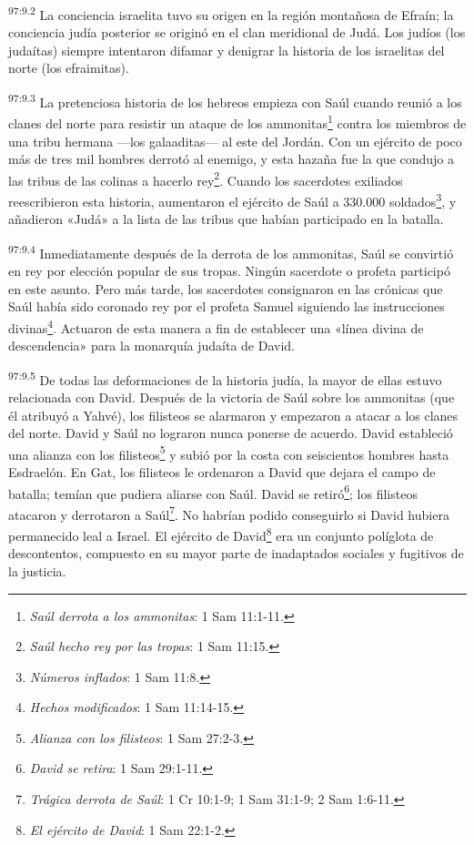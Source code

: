 \par
\textsuperscript{97:9.2} La conciencia israelita tuvo su origen en la región montañosa de Efraín; la conciencia judía posterior se originó en el clan meridional de Judá. Los judíos (los judaítas) siempre intentaron difamar y denigrar la historia de los israelitas del norte (los efraimitas).

\par
\textsuperscript{97:9.3} La pretenciosa historia de los hebreos empieza con Saúl cuando reunió a los clanes del norte para resistir un ataque de los ammonitas\footnote{\textit{Saúl derrota a los ammonitas}: 1 Sam 11:1-11.} contra los miembros de una tribu hermana ---los galaaditas--- al este del Jordán. Con un ejército de poco más de tres mil hombres derrotó al enemigo, y esta hazaña fue la que condujo a las tribus de las colinas a hacerlo rey\footnote{\textit{Saúl hecho rey por las tropas}: 1 Sam 11:15.}. Cuando los sacerdotes exiliados reescribieron esta historia, aumentaron el ejército de Saúl a 330.000 soldados\footnote{\textit{Números inflados}: 1 Sam 11:8.}, y añadieron «Judá» a la lista de las tribus que habían participado en la batalla.

\par
\textsuperscript{97:9.4} Inmediatamente después de la derrota de los ammonitas, Saúl se convirtió en rey por elección popular de sus tropas. Ningún sacerdote o profeta participó en este asunto. Pero más tarde, los sacerdotes consignaron en las crónicas que Saúl había sido coronado rey por el profeta Samuel siguiendo las instrucciones divinas\footnote{\textit{Hechos modificados}: 1 Sam 11:14-15.}. Actuaron de esta manera a fin de establecer una «línea divina de descendencia» para la monarquía judaíta de David.

\par
\textsuperscript{97:9.5} De todas las deformaciones de la historia judía, la mayor de ellas estuvo relacionada con David. Después de la victoria de Saúl sobre los ammonitas (que él atribuyó a Yahvé), los filisteos se alarmaron y empezaron a atacar a los clanes del norte. David y Saúl no lograron nunca ponerse de acuerdo. David estableció una alianza con los filisteos\footnote{\textit{Alianza con los filisteos}: 1 Sam 27:2-3.} y subió por la costa con seiscientos hombres hasta Esdraelón. En Gat, los filisteos le ordenaron a David que dejara el campo de batalla; temían que pudiera aliarse con Saúl. David se retiró\footnote{\textit{David se retira}: 1 Sam 29:1-11.}; los filisteos atacaron y derrotaron a Saúl\footnote{\textit{Trágica derrota de Saúl}: 1 Cr 10:1-9; 1 Sam 31:1-9; 2 Sam 1:6-11.}. No habrían podido conseguirlo si David hubiera permanecido leal a Israel. El ejército de David\footnote{\textit{El ejército de David}: 1 Sam 22:1-2.} era un conjunto políglota de descontentos, compuesto en su mayor parte de inadaptados sociales y fugitivos de la justicia.

